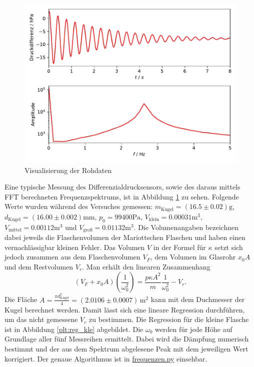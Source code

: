 \documentclass[a4paper, 12pt]{scrartcl}
\begin{document}
\begin{figure}[H]
\centering
\includegraphics[width=\textwidth]{plots/rohdaten_log.pdf}
\caption{Visualisierung der Rohdaten}
\label{rohdaten}
\end{figure}
Eine typische Messung des Differenzialdrucksensors, sowie des daraus mittels FFT berechneten Frequenzspektrums, ist in Abbildung \ref{rohdaten} zu sehen.
Folgende Werte wurden während des Versuches gemessen: $m_{\text{Kugel}} = (16.5\pm 0.02)\text{g}$, $d_{\text{Kugel}} = (16.00 \pm 0.002)\text{mm}$, $p_0 = 99400\text{Pa}$, $V_{\text{klein}} = 0.00031\text{m}^3$, $V_{\text{mittel}} = 0.00112 \text{m}^3$ und $V_{\text{groß}} = 0.01132 \text{m}^3$. Die Volumenangaben bezeichnen dabei jeweils die Flaschenvolumen der Mariottschen Flaschen und haben einen vernachlässigbar kleinen Fehler. Das Volumen $V$ in der Formel für $\kappa$ setzt sich jedoch zusammen aus dem Flaschenvolumen $V_F$, dem Volumen im Glasrohr $x_0A$ und dem Restvolumen $V_r$. Man erhält den linearen Zusammenhang
$$(V_F+x_0A)\left( \frac 1{\omega_0^2}\right) = \frac{p\kappa A^2}m \frac 1{\omega_0^2} - V_r.$$
Die Fläche $A = \frac{\pi d_{\text{Kugel}}^2}{4} = (2.0106 \pm 0.0007)\,\text{m}^2$ kann mit dem Duchmesser der Kugel berechnet werden. Damit lässt sich eine lineare Regression durchführen, um das nicht gemessene $V_r$ zu bestimmen. Die Regression für die kleine Flasche ist in Abbildung \ref{plt:reg_kle} abgebildet. Die $\omega_0$ werden für jede Höhe auf Grundlage aller fünf Messreihen ermittelt. Dabei wird die Dämpfung numerisch bestimmt und der aus dem Spektrum abgelesene Peak mit dem jeweiligen Wert korrigiert. Der genaue Algorithmus ist in \url{frequenzen.py} einsehbar.
\end{document}
